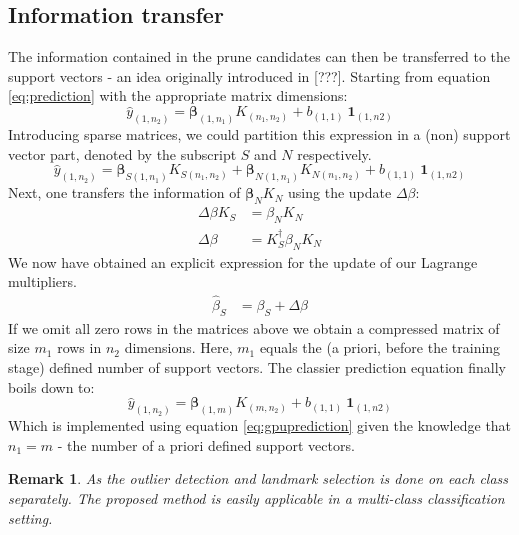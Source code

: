 \documentclass[preprint,12pt]{elsarticle}
\newtheorem*{remark}{Remark}
\begin{document}
	\subsection{Information transfer}
	The information contained in the prune candidates can then be transferred to the support vectors - an idea originally introduced in [???]. Starting from equation \ref{eq:prediction} with the appropriate matrix dimensions:
	\begin{equation}
	\hat{y}_{(1,n_2) } = \mathbf{\beta}_{(1,n_1)} K_{(n_1, n_2)} + b_{(1,1)} \ \mathbf{1}_{(1, n2)} 
	\end{equation}
	Introducing sparse matrices, we could partition this expression in a (non) support vector part, denoted by the subscript $S$ and $N$ respectively.
	\begin{equation}
	\hat{y}_{(1,n_2) } = \mathbf{\beta}_{S(1,n_1)} K_{S(n_1, n_2)} + \mathbf{\beta}_{N(1,n_1)} K_{N(n_1, n_2)} + b_{(1,1)} \ \mathbf{1}_{(1, n2)}
	\end{equation}
	Next, one transfers the information of $\mathbf{\beta}_{N} K_{N}$ using the update $\Delta\beta$: 
	\begin{align}
	\Delta \beta K_S &= \beta_N K_N  \\
	\Delta \beta &= K^\dagger_S  \beta_N K_N
	\end{align}
	We now have obtained an explicit expression for the update of our Lagrange multipliers. 
	\begin{align}
	\hat{\beta}_S &= \beta_S + \Delta\beta
	\end{align}
	If we omit all zero rows in the matrices above we obtain a compressed matrix of size $m_1$ rows in $n_2$ dimensions. Here, $m_1$ equals the (a priori, before the training stage) defined number of support vectors. The classier prediction equation finally boils down to:
	\begin{equation}
	\hat{y}_{(1,n_2) } = \mathbf{\beta}_{(1,m)} K_{(m, n_2)} + b_{(1,1)} \ \mathbf{1}_{(1, n2)} 
	\end{equation}
	Which is implemented using equation \ref{eq:gpuprediction} given the knowledge that $n_1 = m$ - the number of a priori defined support vectors. \\
	
	\begin{remark}
		As the outlier detection and landmark selection is done on each class separately. The proposed method is easily applicable in a multi-class classification setting. 
	\end{remark}
	
\end{document}
